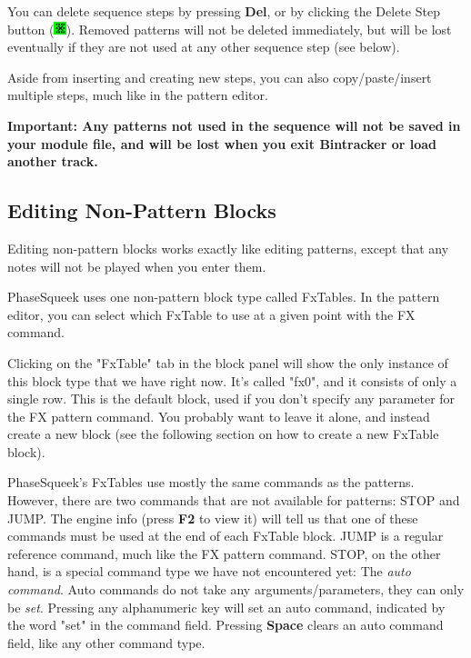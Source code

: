 \documentclass[12pt]{report}	%
\begin{document}
You can delete sequence steps by pressing \textbf{Del}, or by clicking the Delete Step button ({\includegraphics[width=10pt]{button_remove}}). Removed patterns will not be deleted immediately, but will be lost eventually if they are not used at any other sequence step (see below).

Aside from inserting and creating new steps, you can also copy/paste/insert multiple steps, much like in the pattern editor.

\textbf{Important: Any patterns not used in the sequence will not be saved in your module file, and will be lost when you exit Bintracker or load another track.}


\subsection{Editing Non-Pattern Blocks}
\label{subsec:editing-blocks}

Editing non-pattern blocks works exactly like editing patterns, except that any notes will not be played when you enter them.

PhaseSqueek uses one non-pattern block type called FxTables. In the pattern editor, you can select which FxTable to use at a given point with the FX command.

Clicking on the "FxTable" tab in the block panel will show the only instance of this block type that we have right now. It's called "fx0", and it consists of only a single row. This is the default block, used if you don't specify any parameter for the FX pattern command. You probably want to leave it alone, and instead create a new block (see the following section on how to create a new FxTable block).

PhaseSqueek's FxTables use mostly the same commands as the patterns. However, there are two commands that are not available for patterns: STOP and JUMP. The engine info (press \textbf{F2} to view it) will tell us that one of these commands must be used at the end of each FxTable block. JUMP is a regular reference command, much like the FX pattern command. STOP, on the other hand, is a special command type we have not encountered yet: The \textit{auto command}. Auto commands do not take any arguments/parameters, they can only be \textit{set}. Pressing any alphanumeric key will set an auto command, indicated by the word "set" in the command field. Pressing \textbf{Space} clears an auto command field, like any other command type.
\end{document}
